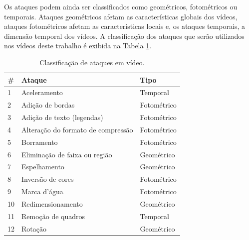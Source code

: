 

Os ataques podem ainda ser classificados como geométricos, fotométricos ou temporais. Ataques geométricos afetam as características globais dos vídeos, ataques fotométricos afetam as características locais e, os ataques temporais, a dimensão temporal dos vídeos. A classificação dos ataques que serão utilizados nos vídeos deste trabalho é exibida na Tabela \ref{tab-classificacao-ataques}.

\begin{table}[!ht]
\centering
\caption{Classificação de ataques em vídeo.}
\label{tab-classificacao-ataques}
\begin{tabular}{|l|l|l|}
\hline
\# & \textbf{Ataque}                    & \textbf{Tipo} \\ \hline
1           & Aceleramento                       & Temporal      \\ \hline
2           & Adição de bordas                   & Fotométrico   \\ \hline
3           & Adição de texto (legendas)         & Fotométrico   \\ \hline
4           & Alteração do formato de compressão & Fotométrico   \\ \hline
5           & Borramento                         & Fotométrico   \\ \hline
6           & Eliminação de faixa ou região      & Geométrico    \\ \hline
7           & Espelhamento                       & Geométrico   \\ \hline
8           & Inversão de cores                  & Fotométrico   \\ \hline
9           & Marca d'água                       & Fotométrico   \\ \hline
10          & Redimensionamento                  & Geométrico    \\ \hline
11          & Remoção de quadros                 & Temporal      \\ \hline
12          & Rotação                            & Geométrico    \\ \hline
\end{tabular}
\end{table}





